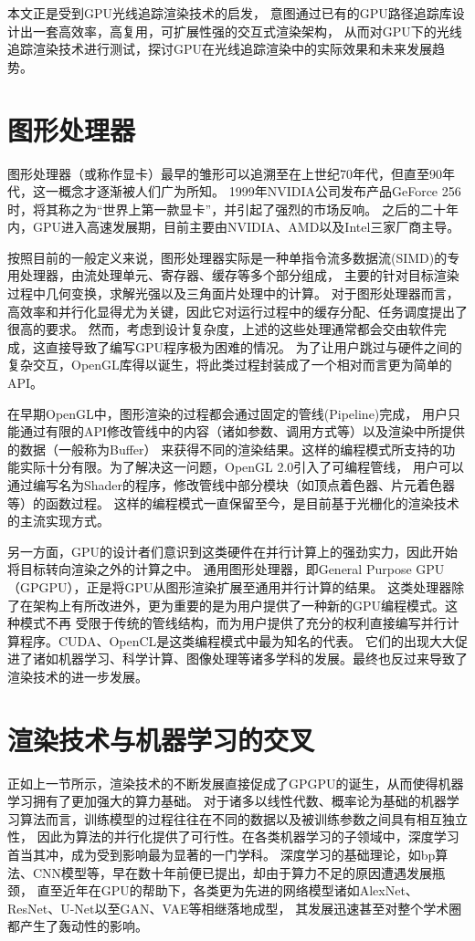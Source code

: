 本文正是受到GPU光线追踪渲染技术的启发，
意图通过已有的GPU路径追踪库设计出一套高效率，高复用，可扩展性强的交互式渲染架构，
从而对GPU下的光线追踪渲染技术进行测试，探讨GPU在光线追踪渲染中的实际效果和未来发展趋势。

\section{图形处理器}
图形处理器（或称作显卡）最早的雏形可以追溯至在上世纪70年代，但直至90年代，这一概念才逐渐被人们广为所知。
1999年NVIDIA公司发布产品GeForce 256时，将其称之为“世界上第一款显卡”\cite{firstGPU}，并引起了强烈的市场反响。
之后的二十年内，GPU进入高速发展期，目前主要由NVIDIA、AMD以及Intel三家厂商主导。

按照目前的一般定义来说，图形处理器实际是一种单指令流多数据流(SIMD)的专用处理器，由流处理单元、寄存器、缓存等多个部分组成，
主要的针对目标渲染过程中几何变换，求解光强以及三角面片处理中的计算。
对于图形处理器而言，高效率和并行化显得尤为关键，因此它对运行过程中的缓存分配、任务调度提出了很高的要求。
然而，考虑到设计复杂度，上述的这些处理通常都会交由软件完成，这直接导致了编写GPU程序极为困难的情况。
为了让用户跳过与硬件之间的复杂交互，OpenGL库得以诞生，将此类过程封装成了一个相对而言更为简单的API。

在早期OpenGL中，图形渲染的过程都会通过固定的管线(Pipeline)完成，
用户只能通过有限的API修改管线中的内容（诸如参数、调用方式等）以及渲染中所提供的数据（一般称为Buffer）
来获得不同的渲染结果。这样的编程模式所支持的功能实际十分有限。为了解决这一问题，OpenGL 2.0引入了可编程管线，
用户可以通过编写名为Shader的程序，修改管线中部分模块（如顶点着色器、片元着色器等）的函数过程。
这样的编程模式一直保留至今，是目前基于光栅化的渲染技术的主流实现方式。

另一方面，GPU的设计者们意识到这类硬件在并行计算上的强劲实力，因此开始将目标转向渲染之外的计算之中。
通用图形处理器，即General Purpose GPU（GPGPU），正是将GPU从图形渲染扩展至通用并行计算的结果。
这类处理器除了在架构上有所改进外，更为重要的是为用户提供了一种新的GPU编程模式。这种模式不再
受限于传统的管线结构，而为用户提供了充分的权利直接编写并行计算程序。CUDA、OpenCL是这类编程模式中最为知名的代表。
它们的出现大大促进了诸如机器学习、科学计算、图像处理等诸多学科的发展。最终也反过来导致了渲染技术的进一步发展。

\section{渲染技术与机器学习的交叉}

正如上一节所示，渲染技术的不断发展直接促成了GPGPU的诞生，从而使得机器学习拥有了更加强大的算力基础。
对于诸多以线性代数、概率论为基础的机器学习算法而言，训练模型的过程往往在不同的数据以及被训练参数之间具有相互独立性，
因此为算法的并行化提供了可行性。在各类机器学习的子领域中，深度学习首当其冲，成为受到影响最为显著的一门学科。
深度学习的基础理论，如bp算法、CNN模型等，早在数十年前便已提出，却由于算力不足的原因遭遇发展瓶颈，
直至近年在GPU的帮助下，各类更为先进的网络模型诸如AlexNet、ResNet、U-Net以至GAN、VAE等相继落地成型，
其发展迅速甚至对整个学术圈都产生了轰动性的影响。

